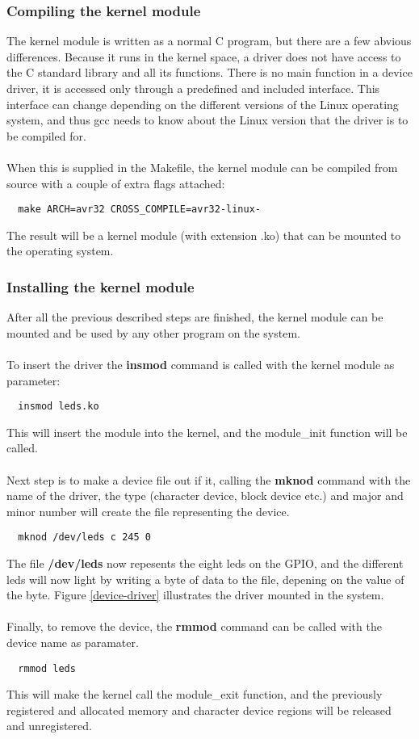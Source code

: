 \subsubsection{Compiling the kernel module}
The kernel module is written as a normal C program, but there are a few
abvious differences. Because it runs in the kernel space, a driver
does not have access to the C standard library and all its functions.
There is no main function in a device driver, it is accessed only
through a predefined and included interface. This interface can change
depending on the different versions of the Linux operating system, and
thus gcc needs to know about the Linux version that the driver is to be
compiled for.\\
\\
When this is supplied in the Makefile, the kernel module can be compiled
from source with a couple of extra flags attached:
\begin{verbatim}
  make ARCH=avr32 CROSS_COMPILE=avr32-linux-
\end{verbatim}
The result will be a kernel module (with extension .ko) that can be
mounted to the operating system.

\subsubsection{Installing the kernel module}
After all the previous described steps are finished, the kernel
module can be mounted and be used by any other program on the system.\\
\\
To insert the driver the \textbf{insmod} command is called with the
kernel module as parameter:
\begin{verbatim}
  insmod leds.ko
\end{verbatim}
This will insert the module into the kernel, and the module\_init
function will be called.\\
\\
Next step is to make a device file out if it, calling the
\textbf{mknod} command with the name of the driver,
the type (character device, block device etc.)
and major and minor number will create the file representing the device.
\begin{verbatim}
  mknod /dev/leds c 245 0
\end{verbatim}
The file \textbf{/dev/leds} now repesents the eight leds on the GPIO,
and the different leds will now light by writing a byte
of data to the file, depening on the value of the byte.
Figure \ref{device-driver} illustrates the driver mounted in the
system.\\
\\
Finally, to remove the device, the \textbf{rmmod} command can be called
with the device name as paramater.
\begin{verbatim}
  rmmod leds
\end{verbatim}
This will make the kernel call the module\_exit function, and the
previously registered and allocated memory and character device regions
will be released and unregistered.
